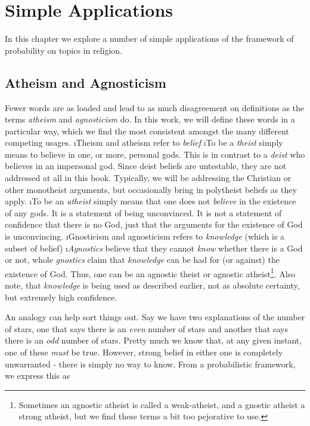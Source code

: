 \chapter{Simple Applications}\label{ch:simpleapp}

In this chapter we explore a number of simple applications of the framework of probability on topics in religion.


\section{Atheism and Agnosticism}\label{sec:atheism_agnosticism}

Fewer words are as loaded and lead to as much disagreement on definitions as the terms {\em atheism} and {\em agnosticism} do.  In this work, we will define these words in a particular way, which we find the most consistent amongst the many different competing usages.  
\bi
\i Theism and atheism refer to {\em belief}
\i To be a {\em theist} simply means to believe in one, or more, personal gods.  This is in contrast to a {\em deist} who believes in an impersonal god.  Since deist beliefs are untestable, they are not addressed at all in this book.  Typically, we will be addressing the Christian or other monotheist arguments, but occasionally bring in polytheist beliefs as they apply.
\i To be an {\em atheist} simply means that one does not {\em believe} in the existence of any gods.  It is a statement of being unconvinced.  It is not a statement of confidence that there is no God, just that the arguments for the existence of God is unconvincing.
\i Gnosticism and agnosticism refers to {\em knowledge} (which is a subset of belief)
\i {\em Agnostics} believe that they cannot {\em know} whether there is a God or not, whole {\em gnostics} claim that {\em knowledge} can be had for (or against) the existence of God.  Thus, one can be an agnostic theist or agnostic atheist\footnote{Sometimes an agnostic atheist is called a weak-atheist, and a gnostic atheist a strong atheist, but we find these terms a bit too pejorative to use.}.  Also note, that {\em knowledge} is being used as described earlier, not as absolute certainty, but extremely high confidence. 
\ei

An analogy can help sort things out.  Say we have two explanations of the number of stars, one that
says there is an \emph{even} number of stars and another that says
 there is an \emph{odd} number of stars. Pretty much we know that,
at any given instant, one of these \emph{must} be true. However, strong
belief in either one is completely unwarranted - there is simply no way
to know. From a probabilistic framework, we express this as

